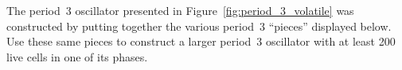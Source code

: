 \begin{multicols}{2}
	
	\mfilbreak
	
	
	\begin{problemstar}\label{exer:period_3_volatile} 
		The period~3 oscillator presented in Figure~\ref{fig:period_3_volatile} was constructed by putting together the various period~3 ``pieces'' displayed below. Use these same pieces to construct a larger period~3 oscillator with at least 200 live cells in one of its phases.
		\begin{center}
		\end{center}
	\end{problemstar}
	
\end{multicols}
\normalsize\vspace*{0.01cm}\ifdefined\FORPRINTING{}\else%
\fi

